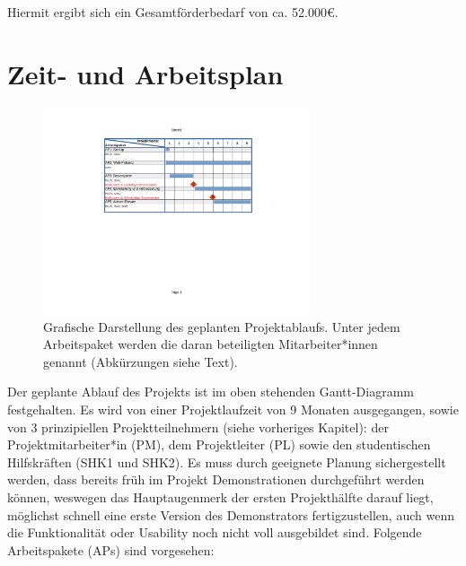 \documentclass[11pt]{article}
\begin{document}
Hiermit ergibt sich ein Gesamtförderbedarf von ca. 52.000\euro.

\newpage
\renewcommand{\thesection}{6}
\section{Zeit- und Arbeitsplan}
\begin{figure}
\centering
\includegraphics[viewport=2.5in 3.5in 8.8in 7.5in,width=0.7\textwidth,clip]{gantt.pdf}
\caption{Grafische Darstellung des geplanten Projektablaufs. Unter jedem Arbeitspaket werden
die daran beteiligten Mitarbeiter*innen genannt (Abkürzungen siehe Text).
}
\end{figure}
Der geplante Ablauf des Projekts ist im oben stehenden Gantt-Diagramm festgehalten.
Es wird von einer Projektlaufzeit von 9 Monaten ausgegangen, sowie von 3 prinzipiellen
Projektteilnehmern (siehe vorheriges Kapitel): der Projektmitarbeiter*in (PM), dem Projektleiter (PL) sowie den studentischen Hilfskräften (SHK1 und SHK2). Es muss durch geeignete Planung sichergestellt werden, dass bereits früh im Projekt Demonstrationen durchgeführt werden können, weswegen das Hauptaugenmerk der ersten Projekthälfte darauf liegt, möglichst schnell eine erste Version des Demonstrators fertigzustellen, auch wenn die Funktionalität oder Usability noch nicht voll ausgebildet sind. Folgende Arbeitspakete (APs) sind vorgesehen:
\end{document}
